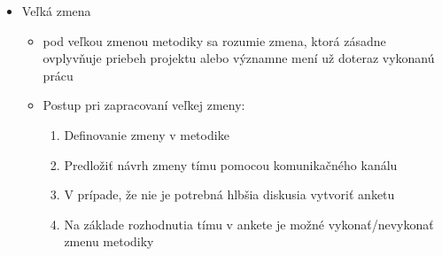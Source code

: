 \documentclass{article}
\begin{document}
\begin{itemize}
            \item Veľká zmena
            \begin{itemize}
                \item pod veľkou zmenou metodiky sa rozumie zmena, ktorá zásadne ovplyvňuje priebeh projektu alebo významne mení už doteraz vykonanú prácu
                \item Postup pri zapracovaní veľkej zmeny:
                \begin{enumerate}
                    \item Definovanie zmeny v metodike
                    \item Predložiť návrh zmeny tímu pomocou komunikačného kanálu
                    \item V prípade, že nie je potrebná hlbšia diskusia vytvoriť anketu
                    \item Na základe rozhodnutia tímu v ankete je možné vykonať/nevykonať zmenu metodiky
                \end{enumerate}
            \end{itemize}
        \end{itemize}
\end{document}
